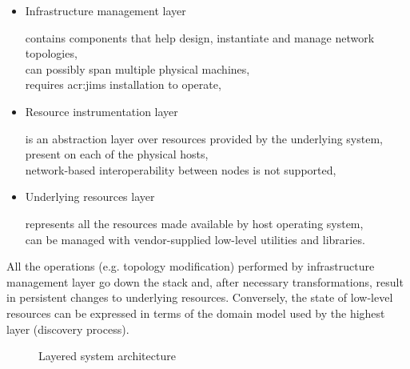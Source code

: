 \documentclass[11pt,openany]{book}
\begin{document}
      \begin{itemize}

        \item Infrastructure management layer

              contains components that help design, instantiate and manage network topologies, \\
              can possibly span multiple physical machines, \\
              requires \gls{acr:jims} installation to operate,

        \item Resource instrumentation layer

              is an abstraction layer over resources provided by the underlying system, \\
              present on each of the physical hosts, \\
              network-based interoperability between nodes is not supported,

        \item Underlying resources layer

              represents all the resources made available by host operating system, \\
              can be managed with vendor-supplied low-level utilities and libraries.

      \end{itemize}

      All the operations (e.g. topology modification) performed by infrastructure management layer go down the stack
      and, after necessary transformations, result in persistent changes to underlying resources. Conversely, the state
      of low-level resources can be expressed in terms of the domain model used by the highest layer (discovery
      process).

      \begin{figure}[H]
        \begin{center}
        \end{center}

        \caption{Layered system architecture}
        \label{fig:arch:layers}
      \end{figure}
\end{document}
